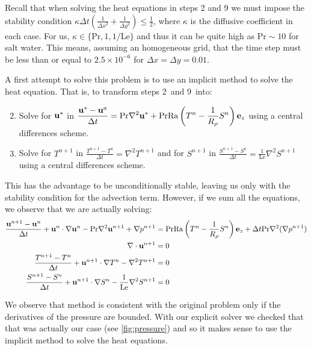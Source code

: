 \documentclass{article}
\def\Ra{\mathrm{Ra}}
\def\Pr{\mathrm{Pr}}
\def\Le{\mathrm{Le}}
\begin{document}
Recall that when solving the heat equations in steps 2 and 9 we must impose the stability condition $\kappa \Delta t\left( \frac{1}{{\Delta x}^2} + \frac{1}{{\Delta y}^2}\right) \leq \frac{1}{2}$, where $\kappa$ is the diffusive coefficient in each case. For us, $\kappa \in \{\Pr, 1, 1/\Le\}$ and thus it can be quite high as $\Pr\sim 10$ for salt water. This means, assuming an homogeneous grid, that the time step must be less than or equal to $2.5\times 10^{-6}$ for $\Delta x = \Delta y = 0.01$.

A first attempt to solve this problem is to use an implicit method to solve the heat equation. That is, to transform steps 2\ and 9\ into:
\begin{enumerate}
  \setcounter{enumi}{1}
  \item Solve for $\boldsymbol{\mathrm{u}}^*$ in $\displaystyle  \frac{\vf{u}^* - \vf{u}^a}{\Delta t} = \Pr \nabla^2 \vf{u}^* +\Pr\Ra\left(T^n - \frac{1}{R_{\rho}}S^n\right)\vf{e}_z$ using a central differences scheme.
        \setcounter{enumi}{8}
  \item Solve for $T^{n+1}$ in $\displaystyle  \frac{T^{n+1}-T^{a}}{\Delta t} = \nabla^2 T^{n+1}$ and for $S^{n+1}$ in $\displaystyle  \frac{S^{n+1}-S^{a}}{\Delta t} = \frac{1}{\Le}\nabla^2 S^{n+1}$ using a central differences scheme.
\end{enumerate}

This has the advantage to be unconditionally stable, leaving us only with the stability condition for the advection term. However, if we sum all the equations, we observe that we are actually solving:
\begin{align*}
  \frac{\vf{u}^{n+1}-\vf{u}^n}{\Delta t} + \vf{u}^n \cdot \nabla \vf{u}^n - \Pr \nabla^2 \vf{u}^{n+1} + \nabla p^{n+1} & = \Pr\Ra\left(T^n - \frac{1}{R_{\rho}}S^n\right)\vf{e}_z+\Delta t \Pr \nabla^2(\nabla p^{n+1}) \\
  \nabla \cdot \vf{u}^{n+1}                                                                                            & = 0                                     \\
  \frac{T^{n+1}-T^{n}}{\Delta t} + \vf{u}^{n+1} \cdot \nabla T^{n} - \nabla^2 T^{n+1}                                  & = 0                                     \\
  \frac{S^{n+1}-S^{n}}{\Delta t} + \vf{u}^{n+1} \cdot \nabla S^{n} - \frac{1}{\Le}\nabla^2 S^{n+1}                     & = 0
\end{align*}

We observe that method is consistent with the original problem only if the derivatives of the pressure are bounded. With our explicit solver we checked that that was actually our case (see \cref{fig:pressure}) and so it makes sense to use the implicit method to solve the heat equations. 
\end{document}
